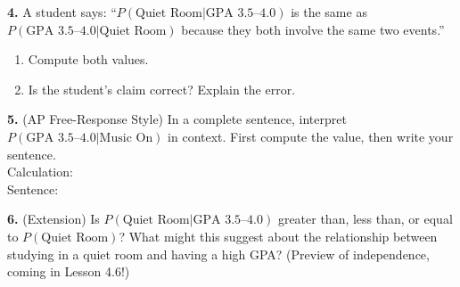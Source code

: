 \documentclass[10pt]{article}
\begin{document}
\begin{practicebox}
\vspace{8pt}
\textbf{4.} A student says: ``$P(\text{Quiet Room}|\text{GPA 3.5--4.0})$ is the same
as $P(\text{GPA 3.5--4.0}|\text{Quiet Room})$ because they both involve the same two events.''
\begin{enumerate}[label=(\alph*), leftmargin=2em, itemsep=6pt]
  \item Compute both values. \gradedhide{\writeline\writeline}
  \item Is the student's claim correct? Explain the error.\\
\end{enumerate}

\vspace{8pt}
\textbf{5.} (AP Free-Response Style) In a complete sentence, interpret
$P(\text{GPA 3.5--4.0} | \text{Music On})$ in context.
First compute the value, then write your sentence.\\
Calculation: \makebox[6cm][l]{\hspace{1.6cm}\smash{\raisebox{-4pt}{\gradedblank[id=hw5a, type=short, points=1, answer=0.25, check=numeric, tolerance=0.002, display={$20/80 = 0.25$}]{2.5cm}{0.2in}}}}\\
Sentence:\\

\vspace{8pt}
\textbf{6.} (Extension) Is $P(\text{Quiet Room}|\text{GPA 3.5--4.0})$ greater than,
less than, or equal to $P(\text{Quiet Room})$? What might this suggest about
the relationship between studying in a quiet room and having a high GPA?
(Preview of independence, coming in Lesson 4.6!)\\
\writeline\writeline\writeline
\end{practicebox}
\end{document}
